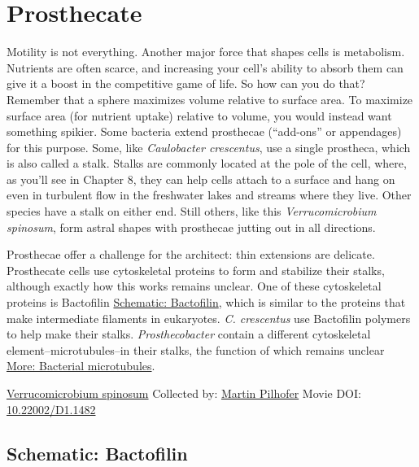 \documentclass[]{tufte-book}
\begin{document}
\hypertarget{prosthecate}{%
\section{Prosthecate}\label{prosthecate}}

Motility is not everything. Another major force that shapes cells is metabolism. Nutrients are often scarce, and increasing your cell's ability to absorb them can give it a boost in the competitive game of life. So how can you do that? Remember that a sphere maximizes volume relative to surface area. To maximize surface area (for nutrient uptake) relative to volume, you would instead want something spikier. Some bacteria extend prosthecae (``add-ons'' or appendages) for this purpose. Some, like \emph{Caulobacter crescentus}, use a single prostheca, which is also called a stalk. Stalks are commonly located at the pole of the cell, where, as you'll see in Chapter 8, they can help cells attach to a surface and hang on even in turbulent flow in the freshwater lakes and streams where they live. Other species have a stalk on either end. Still others, like this \emph{Verrucomicrobium spinosum}, form astral shapes with prosthecae jutting out in all directions.

Prosthecae offer a challenge for the architect: thin extensions are delicate. Prosthecate cells use cytoskeletal proteins to form and stabilize their stalks, although exactly how this works remains unclear. One of these cytoskeletal proteins is Bactofilin \protect\hyperlink{Bactofilin}{Schematic: Bactofilin}, which is similar to the proteins that make intermediate filaments in eukaryotes. \emph{C. crescentus} use Bactofilin polymers to help make their stalks. \emph{Prosthecobacter} contain a different cytoskeletal element--microtubules--in their stalks, the function of which remains unclear \protect\hyperlink{Bacterial_microtubules}{More: Bacterial microtubules}.



\hypertarget{htmlwidget-0c157ea93bc8dc5221e0}{}

\label{fig:3-6}\protect\hyperlink{tree}{Verrucomicrobium spinosum} Collected by: \protect\hyperlink{martin_pilhofer}{Martin Pilhofer} Movie DOI: \href{https://doi.org/10.22002/D1.1482}{10.22002/D1.1482}

\hypertarget{Bactofilin}{%
\subsection*{Schematic: Bactofilin}\label{Bactofilin}}
\end{document}
